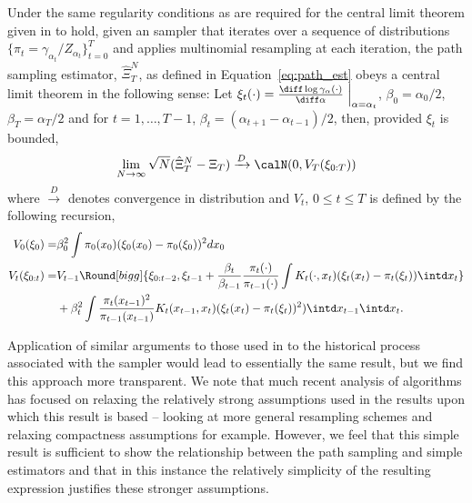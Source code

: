 \begin{proposition}\label{prop:path_clt}
  Under the same regularity conditions as are required for the central limit theorem given in \cite{DelMoral:2006hc} to hold, given an \smc sampler that iterates over a sequence of distributions $\{\pi_t = \gamma_{\alpha_t}/Z_{\alpha_t}\}_{t=0}^T$ and applies multinomial resampling at each iteration, the path sampling estimator, $\hat\Xi_{T}^{N}$, as defined in Equation~\eqref{eq:path_est} obeys a central limit theorem in the following sense: Let $\xi_t(\cdot) = \frac{\diff\log \gamma_{\alpha}(\cdot)}{\diff\alpha}\Bigm|_{\alpha = \alpha_t}$, $\beta_{0} = \alpha_0 / 2$, $\beta_{T} = \alpha_T / 2$ and for $t = 1,\ldots,T-1$, $\beta_t = (\alpha_{t + 1} - \alpha_{t-1})/2$, then, provided $\xi_t$ is bounded,
  \begin{equation}
    \lim_{N\to\infty}\sqrt{N}(\hat\Xi_{T}^{N} - \Xi_T)
    \xrightarrow{D}\calN(0, V_T(\xi_{0:T}))
  \end{equation}
  where $\xrightarrow{D}$ denotes convergence in distribution and $V_t$, $0\le t \le T$ is defined by the following recursion,
  \begin{align}
    V_0(\xi_0) =&  \beta_0^2
    \int \pi_0(x_0) (\xi_0(x_0)
    - \pi_0(\xi_0))^2 dx_0 \\
    V_t(\xi_{0:t}) =& V_{t-1}\Round[bigg]{\xi_{0:t-2}, \xi_{t-1}
    + \frac{\beta_t}{\beta_{t-1}}
    \frac{\pi_{t}(\cdot)}{\pi_{t-1}(\cdot)}
    \int K_t(\cdot,x_t) (\xi_t(x_t)-\pi_t(\xi_t)) \intd x_t
    } \\\notag
    &+ \beta_t^2 \int\frac{\pi_t(x_{t-1})^2}{\pi_{t-1}(x_{t-1})}
    K_t(x_{t-1},x_t)(\xi_t(x_t) - \pi_t(\xi_t))^2) \intd x_{t-1} \intd x_t.
  \end{align}
\end{proposition}

Application of similar arguments to those used in \cite{DelMoral:2006hc} to the historical process associated with the \smc sampler would lead to essentially the same result, but we find this approach more transparent. We note that much recent analysis of \smc algorithms has focused on relaxing the relatively strong assumptions used in the results upon which this result is based -- looking at more general resampling schemes \cite{DelMoral:2012jq} and relaxing compactness assumptions \cite{Whiteley:2013vx} for example. However, we feel that this simple result is sufficient to show the relationship between the path sampling and simple estimators and that in this instance the relatively simplicity of the resulting expression justifies these stronger assumptions.

